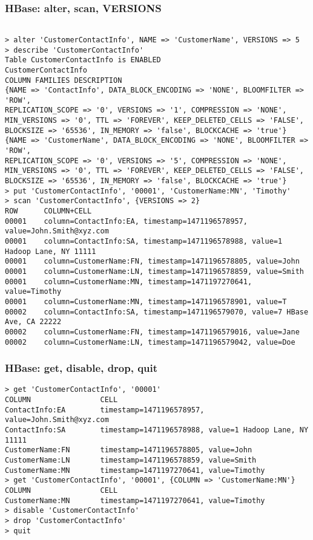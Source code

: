 \documentclass{beamer}
\begin{document}
\begin{frame}[fragile]
 \frametitle{HBase: alter, scan, VERSIONS}
{\color{mycolorcli}
  \begin{lstlisting}[frame=single, basicstyle=\tiny]

> alter 'CustomerContactInfo', NAME => 'CustomerName', VERSIONS => 5
> describe 'CustomerContactInfo'
Table CustomerContactInfo is ENABLED                                     
CustomerContactInfo
COLUMN FAMILIES DESCRIPTION
{NAME => 'ContactInfo', DATA_BLOCK_ENCODING => 'NONE', BLOOMFILTER => 'ROW', 
REPLICATION_SCOPE => '0', VERSIONS => '1', COMPRESSION => 'NONE', 
MIN_VERSIONS => '0', TTL => 'FOREVER', KEEP_DELETED_CELLS => 'FALSE', 
BLOCKSIZE => '65536', IN_MEMORY => 'false', BLOCKCACHE => 'true'}                                     
{NAME => 'CustomerName', DATA_BLOCK_ENCODING => 'NONE', BLOOMFILTER => 'ROW', 
REPLICATION_SCOPE => '0', VERSIONS => '5', COMPRESSION => 'NONE', 
MIN_VERSIONS => '0', TTL => 'FOREVER', KEEP_DELETED_CELLS => 'FALSE', 
BLOCKSIZE => '65536', IN_MEMORY => 'false', BLOCKCACHE => 'true'}
> put 'CustomerContactInfo', '00001', 'CustomerName:MN', 'Timothy'
> scan 'CustomerContactInfo', {VERSIONS => 2}
ROW      COLUMN+CELL 
00001    column=ContactInfo:EA, timestamp=1471196578957, value=John.Smith@xyz.com 
00001    column=ContactInfo:SA, timestamp=1471196578988, value=1 Hadoop Lane, NY 11111 
00001    column=CustomerName:FN, timestamp=1471196578805, value=John 
00001    column=CustomerName:LN, timestamp=1471196578859, value=Smith 
00001    column=CustomerName:MN, timestamp=1471197270641, value=Timothy 
00001    column=CustomerName:MN, timestamp=1471196578901, value=T 
00002    column=ContactInfo:SA, timestamp=1471196579070, value=7 HBase Ave, CA 22222 
00002    column=CustomerName:FN, timestamp=1471196579016, value=Jane 
00002    column=CustomerName:LN, timestamp=1471196579042, value=Doe
  \end{lstlisting}
}
\end{frame}

\begin{frame}[fragile]
 \frametitle{HBase: get, disable, drop, quit}
{\color{mycolorcli}
  \begin{lstlisting}[frame=single, basicstyle=\tiny]
> get 'CustomerContactInfo', '00001'
COLUMN                CELL 
ContactInfo:EA        timestamp=1471196578957, value=John.Smith@xyz.com 
ContactInfo:SA        timestamp=1471196578988, value=1 Hadoop Lane, NY 11111 
CustomerName:FN       timestamp=1471196578805, value=John 
CustomerName:LN       timestamp=1471196578859, value=Smith 
CustomerName:MN       timestamp=1471197270641, value=Timothy
> get 'CustomerContactInfo', '00001', {COLUMN => 'CustomerName:MN'}
COLUMN                CELL 
CustomerName:MN       timestamp=1471197270641, value=Timothy
> disable 'CustomerContactInfo'
> drop 'CustomerContactInfo'
> quit
  \end{lstlisting}
}

\end{frame}
\end{document}
